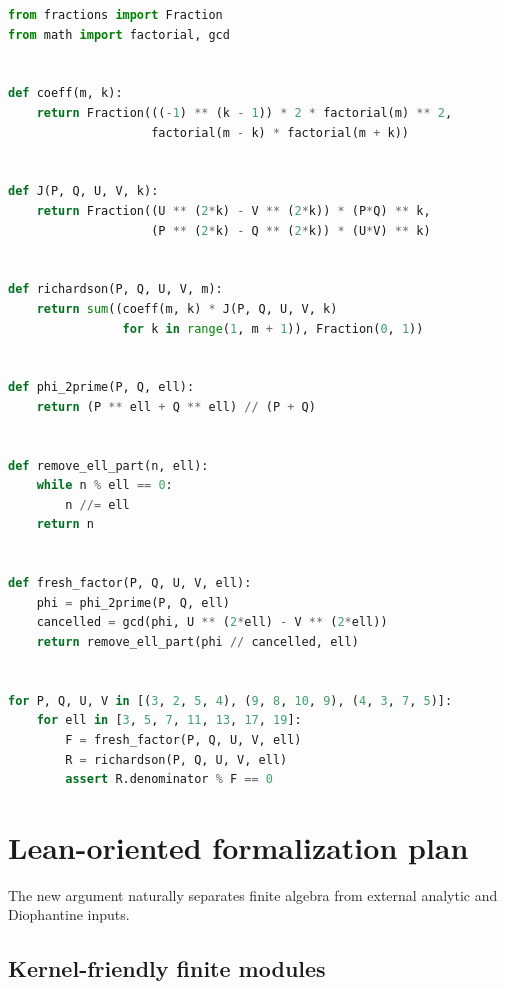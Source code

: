 \documentclass[11pt]{article}
\theoremstyle{definition}
\begin{document}
\begin{lstlisting}[language=Python]
from fractions import Fraction
from math import factorial, gcd


def coeff(m, k):
    return Fraction(((-1) ** (k - 1)) * 2 * factorial(m) ** 2,
                    factorial(m - k) * factorial(m + k))


def J(P, Q, U, V, k):
    return Fraction((U ** (2*k) - V ** (2*k)) * (P*Q) ** k,
                    (P ** (2*k) - Q ** (2*k)) * (U*V) ** k)


def richardson(P, Q, U, V, m):
    return sum((coeff(m, k) * J(P, Q, U, V, k)
                for k in range(1, m + 1)), Fraction(0, 1))


def phi_2prime(P, Q, ell):
    return (P ** ell + Q ** ell) // (P + Q)


def remove_ell_part(n, ell):
    while n % ell == 0:
        n //= ell
    return n


def fresh_factor(P, Q, U, V, ell):
    phi = phi_2prime(P, Q, ell)
    cancelled = gcd(phi, U ** (2*ell) - V ** (2*ell))
    return remove_ell_part(phi // cancelled, ell)


for P, Q, U, V in [(3, 2, 5, 4), (9, 8, 10, 9), (4, 3, 7, 5)]:
    for ell in [3, 5, 7, 11, 13, 17, 19]:
        F = fresh_factor(P, Q, U, V, ell)
        R = richardson(P, Q, U, V, ell)
        assert R.denominator % F == 0
\end{lstlisting}

\section{Lean-oriented formalization plan}
\label{sec:lean}

The new argument naturally separates finite algebra from external analytic
and Diophantine inputs.

\subsection{Kernel-friendly finite modules}
\end{document}
